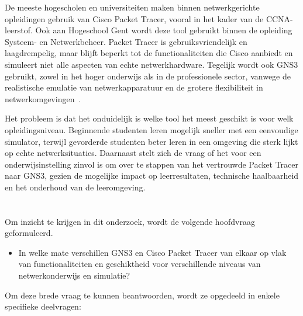 De meeste hogescholen en universiteiten maken binnen netwerkgerichte opleidingen gebruik van Cisco Packet Tracer, vooral in het kader van de CCNA-leerstof. Ook aan Hogeschool Gent wordt deze tool gebruikt binnen de opleiding Systeem- en Netwerkbeheer. Packet Tracer is gebruiksvriendelijk en laagdrempelig, maar blijft beperkt tot de functionaliteiten die Cisco aanbiedt en simuleert niet alle aspecten van echte netwerkhardware. Tegelijk wordt ook GNS3 gebruikt, zowel in het hoger onderwijs als in de professionele sector, vanwege de realistische emulatie van netwerkapparatuur en de grotere flexibiliteit in netwerkomgevingen~\autocite{gns3_docs2025}.

\vspace{0.5cm}

Het probleem is dat het onduidelijk is welke tool het meest geschikt is voor welk opleidingsniveau. Beginnende studenten leren mogelijk sneller met een eenvoudige simulator, terwijl gevorderde studenten beter leren in een omgeving die sterk lijkt op echte netwerksituaties. Daarnaast stelt zich de vraag of het voor een onderwijsinstelling zinvol is om over te stappen van het vertrouwde Packet Tracer naar GNS3, gezien de mogelijke impact op leerresultaten, technische haalbaarheid en het onderhoud van de leeromgeving.

\section{}%
\label{sec:onderzoeksvraag}
Om inzicht te krijgen in dit onderzoek, wordt de volgende hoofdvraag geformuleerd. 



\begin{itemize}
   \item In welke mate verschillen GNS3 en Cisco Packet Tracer van elkaar op vlak van functionaliteiten en geschiktheid voor verschillende niveaus van netwerkonderwijs en simulatie?
\end{itemize}

Om deze brede vraag te kunnen beantwoorden, wordt ze opgedeeld in enkele specifieke deelvragen:

